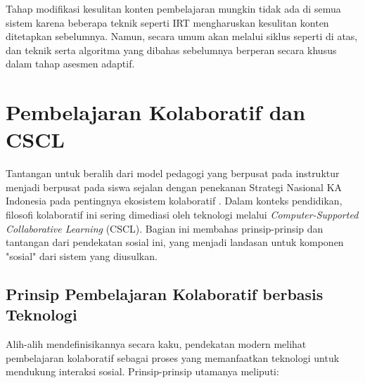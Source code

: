 Tahap modifikasi kesulitan konten pembelajaran mungkin tidak ada di semua sistem
karena beberapa teknik seperti IRT mengharuskan kesulitan konten ditetapkan sebelumnya.
Namun, secara umum akan melalui siklus seperti di atas, dan teknik serta algoritma
yang dibahas sebelumnya berperan secara khusus dalam tahap asesmen adaptif.


\section{Pembelajaran Kolaboratif dan CSCL}
\label{sec:collaborative_learning}
Tantangan untuk beralih dari model pedagogi yang berpusat pada instruktur menjadi
berpusat pada siswa \autocite{Ryoo2021} sejalan dengan penekanan Strategi Nasional
KA Indonesia pada pentingnya ekosistem kolaboratif \autocite{BPPT2020}. Dalam konteks
pendidikan, filosofi kolaboratif ini sering dimediasi oleh teknologi melalui
\textit{Computer-Supported Collaborative Learning} (CSCL). Bagian ini membahas
prinsip-prinsip dan tantangan dari pendekatan sosial ini, yang menjadi landasan
untuk komponen "sosial" dari sistem yang diusulkan.

\subsection{Prinsip Pembelajaran Kolaboratif berbasis Teknologi}
\label{ssec:prinsip_cscl}
Alih-alih mendefinisikannya secara kaku, pendekatan modern melihat pembelajaran
kolaboratif sebagai proses yang memanfaatkan teknologi untuk mendukung interaksi
sosial. Prinsip-prinsip utamanya meliputi:

